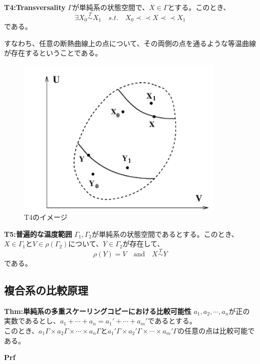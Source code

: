 \documentclass[a4paper,11pt]{jsarticle}
\numberwithin{equation}{section}
\begin{document}
\begin{itembox}[l]{\textbf{T4:Transversality}}
    $\Gamma$が単純系の状態空間で、$X \in \Gamma$とする。このとき、
    \begin{equation}
    \exists X_0 \overset{T}{\sim} X_1 \quad s.t.\quad  X_0 \prec \prec X \prec \prec X_1
    \end{equation}
    である。
\end{itembox}
すなわち、任意の断熱曲線上の点について、その両側の点を通るような等温曲線が存在するということである。\\
\begin{figure}[H]
    \begin{center}
    \includegraphics[width=100mm]{fig6a.png}
    \end{center}
    \caption{T4のイメージ}
    \label{fig:four}
\end{figure}

\begin{itembox}[l]{\textbf{T5:普遍的な温度範囲}}
    $\Gamma_1,\Gamma_2$が単純系の状態空間であるとする。このとき、$X \in \Gamma_1$と$V \in \rho (\Gamma_2)$について、$Y \in \Gamma_2$が存在して、
    \begin{equation}
        \rho(Y) =V \quad \text{and} \quad X \overset{T}{\sim} Y
    \end{equation}
    である。
\end{itembox}

\subsection{複合系の比較原理}
\begin{itembox}[l]{\textbf{Thm:単純系の多重スケーリングコピーにおける比較可能性}}
    $a_1,a_2,\cdots,a_n$が正の実数であるとし、$a_1+\cdots +a_n=a_1'+\cdots+a_m'$であるとする。\\
    このとき、$a_1 \Gamma \times a_2 \Gamma \times \cdots \times a_n \Gamma$と$a_1' \Gamma \times a_2' \Gamma \times \cdots \times a_m' \Gamma$の任意の点は比較可能である。
\end{itembox}
\textbf{Prf}\\
\hfill\qedsymbol\\
\end{document}
